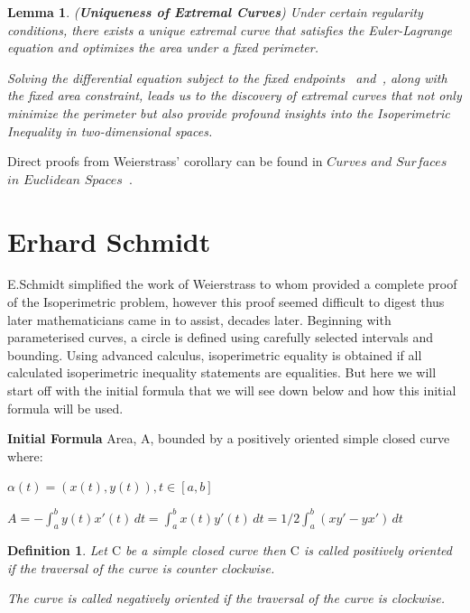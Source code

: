 \documentclass[a4paper]{book}
\newtheorem{lemma}[theorem]{Lemma}%
\newtheorem{definition}[theorem]{Definition}%
\numberwithin{theorem}{section}%
\begin{document}
    \begin{lemma}(\textbf{Uniqueness of Extremal Curves})
        Under certain regularity conditions, there exists a unique extremal curve that satisfies the Euler-Lagrange equation and optimizes the area under a fixed perimeter.

        Solving the differential equation subject to the fixed endpoints~\citep{goldstein1980classical} and~\citep{hilbert1985methods}, along with the fixed area constraint, leads us to the discovery of extremal curves that not only minimize the perimeter but also provide profound insights into the Isoperimetric Inequality in two-dimensional spaces.
    \end{lemma}
Direct proofs from Weierstrass' corollary can be found in $Curves$ $and$ $Surfaces$ $in$ $Euclidean$ $Spaces$~\citep{chern1966curves}.

\section{Erhard Schmidt}
E.Schmidt simplified the work of Weierstrass to whom provided a complete proof of the Isoperimetric problem, however this proof seemed difficult to digest thus later mathematicians came in to assist, decades later. Beginning with parameterised curves, a circle is defined using carefully selected intervals and bounding. Using advanced calculus, isoperimetric equality is obtained if all calculated isoperimetric inequality statements are equalities. But here we will start off with the initial formula that we will see down below and how this initial formula will be used.

\textbf{Initial Formula}
Area, A, bounded by a positively oriented simple closed curve where: 
\begin{center}
	$\alpha(t)=(x(t),y(t)), t\in [a,b]$
\end{center}
\begin{center}
	$A=-\int_{a}^{b}y(t)x'(t)\,dt=\int_{a}^{b}x(t)y'(t)\,dt = 1/2\int_{a}^{b}(xy'-yx')\,dt$
\end{center}

\begin{definition}
    Let $\mathrm{C}$ be a simple closed curve then $\mathrm{C}$ is called positively oriented if the traversal of the curve is counter clockwise.

    The curve is called negatively oriented if the traversal of the curve is clockwise. 
\end{definition}
\end{document}
